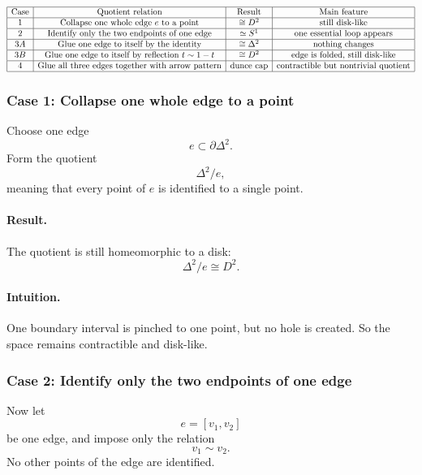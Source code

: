 \documentclass[12pt,a4paper]{article}
\theoremstyle{notespace}
\begin{document}
\[
\begin{array}{|c|c|c|c|}
	\hline
	\text{Case} & \text{Quotient relation} & \text{Result} & \text{Main feature} \\
	\hline
	1 &
	\text{Collapse one whole edge } e \text{ to a point} &
	\cong D^2 &
	\text{still disk-like} \\
	\hline
	2 &
	\text{Identify only the two endpoints of one edge} &
	\simeq S^1 &
	\text{one essential loop appears} \\
	\hline
	3A &
	\text{Glue one edge to itself by the identity} &
	\cong \Delta^2 &
	\text{nothing changes} \\
	\hline
	3B &
	\text{Glue one edge to itself by reflection } t\sim 1-t &
	\cong D^2 &
	\text{edge is folded, still disk-like} \\
	\hline
	4 &
	\text{Glue all three edges together with arrow pattern} &
	\text{dunce cap} &
	\text{contractible but nontrivial quotient} \\
	\hline
\end{array}
\]

\subsubsection{Case 1: Collapse one whole edge to a point}

Choose one edge
\[
e\subset \partial \Delta^2.
\]
Form the quotient
\[
\Delta^2/e,
\]
meaning that every point of \(e\) is identified to a single point.

\paragraph{Result.}
The quotient is still homeomorphic to a disk:
\[
\Delta^2/e \cong D^2.
\]

\paragraph{Intuition.}
One boundary interval is pinched to one point, but no hole is created. So the space remains contractible and disk-like.

\subsubsection{Case 2: Identify only the two endpoints of one edge}

Now let
\[
e=[v_1,v_2]
\]
be one edge, and impose only the relation
\[
v_1\sim v_2.
\]
No other points of the edge are identified.
\end{document}
